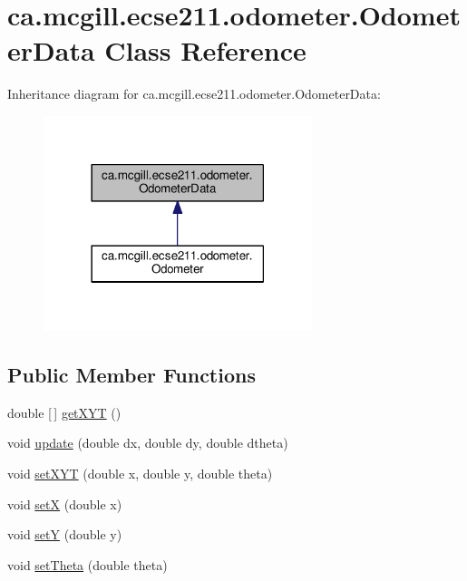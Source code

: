 \hypertarget{classca_1_1mcgill_1_1ecse211_1_1odometer_1_1_odometer_data}{}\section{ca.\+mcgill.\+ecse211.\+odometer.\+Odometer\+Data Class Reference}
\label{classca_1_1mcgill_1_1ecse211_1_1odometer_1_1_odometer_data}


Inheritance diagram for ca.\+mcgill.\+ecse211.\+odometer.\+Odometer\+Data\+:
\nopagebreak
\begin{figure}[H]
\begin{center}
\leavevmode
\includegraphics[width=222pt]{classca_1_1mcgill_1_1ecse211_1_1odometer_1_1_odometer_data__inherit__graph}
\end{center}
\end{figure}
\subsection*{Public Member Functions}
\begin{DoxyCompactItemize}
\item 
double \mbox{[}$\,$\mbox{]} \hyperlink{classca_1_1mcgill_1_1ecse211_1_1odometer_1_1_odometer_data_a8f40f0264c68f0cbed4fff1723ae7863}{get\+X\+YT} ()
\item 
void \hyperlink{classca_1_1mcgill_1_1ecse211_1_1odometer_1_1_odometer_data_aaa06f190d634299fcb1b97a1891dad85}{update} (double dx, double dy, double dtheta)
\item 
void \hyperlink{classca_1_1mcgill_1_1ecse211_1_1odometer_1_1_odometer_data_a2ebc18a13aea6276122d9ef4ee100bb9}{set\+X\+YT} (double x, double y, double theta)
\item 
void \hyperlink{classca_1_1mcgill_1_1ecse211_1_1odometer_1_1_odometer_data_a2911d7215e47f3064defe016b46bfeef}{setX} (double x)
\item 
void \hyperlink{classca_1_1mcgill_1_1ecse211_1_1odometer_1_1_odometer_data_a82986438cd462e66520bc62bb4bd2b75}{setY} (double y)
\item 
void \hyperlink{classca_1_1mcgill_1_1ecse211_1_1odometer_1_1_odometer_data_a419b8f07c2c5374411c8e62298e9a402}{set\+Theta} (double theta)
\end{DoxyCompactItemize}
